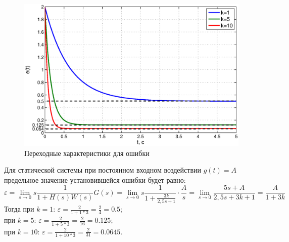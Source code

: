 \documentclass[12pt,a4paper]{article}
\begin{document}
\begin{figure}[H]
	\centering
	\includegraphics[width=1\linewidth]{1.1.2.eps}
	\caption{Переходные характеристики для ошибки}
\end{figure}
Для статической системы при постоянном входном воздействии $g(t)=A$ предельное значение установившейся ошибки будет равно:
\begin{equation}
    \varepsilon = \lim_{s\to 0}s\frac{1}{1+H(s)W(s)}G(s) = \lim_{s\to0} s\frac{1}{1+ \displaystyle{\frac{3k}{2,5s+1}}}\cdot\frac{A}{s} = \lim_{s\to0} \frac{5s+A}{2,5s+3k+1} = \frac{A}{1+3k}
\end{equation}
Тогда при $k=1$: $\varepsilon = \displaystyle{\frac{2}{1+1*3}} = \frac{2}{4} = 0.5;$\\
при $k=5$: $\varepsilon = \displaystyle{\frac{2}{1+5*3}} = \frac{2}{16} = 0.125;$\\
при $k=10$: $\varepsilon = \displaystyle{\frac{2}{1+10*3}} = \frac{2}{31} = 0.0645.$\\
\end{document}
